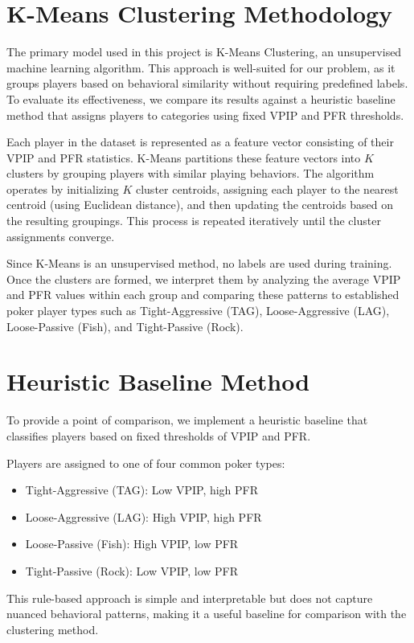 \documentclass[11pt]{extarticle}
\begin{document}
\section{K-Means Clustering Methodology}
The primary model used in this project is K-Means Clustering, an unsupervised machine learning algorithm. This approach is well-suited for our problem, as it groups players based on behavioral similarity without requiring predefined labels. To evaluate its effectiveness, we compare its results against a heuristic baseline method that assigns players to categories using fixed VPIP and PFR thresholds.

Each player in the dataset is represented as a feature vector consisting of their VPIP and PFR statistics. K-Means partitions these feature vectors into \( K \) clusters by grouping players with similar playing behaviors. The algorithm operates by initializing \( K \) cluster centroids, assigning each player to the nearest centroid (using Euclidean distance), and then updating the centroids based on the resulting groupings. This process is repeated iteratively until the cluster assignments converge.

Since K-Means is an unsupervised method, no labels are used during training. Once the clusters are formed, we interpret them by analyzing the average VPIP and PFR values within each group and comparing these patterns to established poker player types such as Tight-Aggressive (TAG), Loose-Aggressive (LAG), Loose-Passive (Fish), and Tight-Passive (Rock).

\section{Heuristic Baseline Method}
To provide a point of comparison, we implement a heuristic baseline that classifies players based on fixed thresholds of VPIP and PFR.

Players are assigned to one of four common poker types:
\begin{itemize}
    \item Tight-Aggressive (TAG): Low VPIP, high PFR
    \item Loose-Aggressive (LAG): High VPIP, high PFR
    \item Loose-Passive (Fish): High VPIP, low PFR
    \item Tight-Passive (Rock): Low VPIP, low PFR
\end{itemize}

This rule-based approach is simple and interpretable but does not capture nuanced behavioral patterns, making it a useful baseline for comparison with the clustering method.
\end{document}
